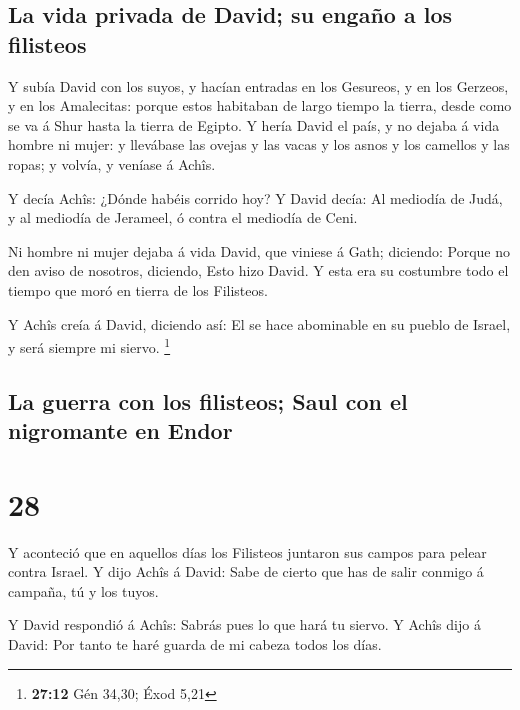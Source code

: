 \hypertarget{la-vida-privada-de-david-su-engauxf1o-a-los-filisteos}{%
\subsection{La vida privada de David; su engaño a los
filisteos}\label{la-vida-privada-de-david-su-engauxf1o-a-los-filisteos}}

 Y subía David con los suyos, y hacían entradas en los
Gesureos, y en los Gerzeos, y en los Amalecitas: porque estos habitaban
de largo tiempo la tierra, desde como se va á Shur hasta la tierra de
Egipto.  Y hería David el país, y no dejaba á vida hombre
ni mujer: y llevábase las ovejas y las vacas y los asnos y los camellos
y las ropas; y volvía, y veníase á Achîs.

 Y decía Achîs: ¿Dónde habéis corrido hoy? Y David decía:
Al mediodía de Judá, y al mediodía de Jerameel, ó contra el mediodía de
Ceni.

 Ni hombre ni mujer dejaba á vida David, que viniese á
Gath; diciendo: Porque no den aviso de nosotros, diciendo, Esto hizo
David. Y esta era su costumbre todo el tiempo que moró en tierra de los
Filisteos.

 Y Achîs creía á David, diciendo así: El se hace
abominable en su pueblo de Israel, y será siempre mi siervo. \footnote{\textbf{27:12}
  Gén 34,30; Éxod 5,21}

\hypertarget{la-guerra-con-los-filisteos-saul-con-el-nigromante-en-endor}{%
\subsection{La guerra con los filisteos; Saul con el nigromante en
Endor}\label{la-guerra-con-los-filisteos-saul-con-el-nigromante-en-endor}}

\hypertarget{section-27}{%
\section{28}\label{section-27}}

 Y aconteció que en aquellos días los Filisteos juntaron
sus campos para pelear contra Israel. Y dijo Achîs á David: Sabe de
cierto que has de salir conmigo á campaña, tú y los tuyos.

 Y David respondió á Achîs: Sabrás pues lo que hará tu
siervo. Y Achîs dijo á David: Por tanto te haré guarda de mi cabeza
todos los días.

